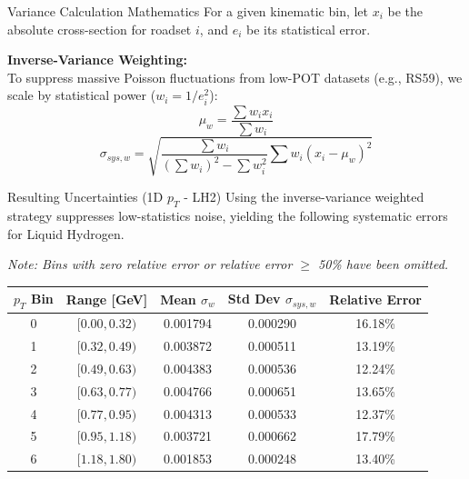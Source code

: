 \documentclass[aspectratio=169]{beamer}
\begin{document}
\begin{frame}{Variance Calculation Mathematics}
    For a given kinematic bin, let $x_i$ be the absolute cross-section for roadset $i$, and $e_i$ be its statistical error.
    \vspace{0.5cm}
    
    \textbf{Inverse-Variance Weighting:} \\
    To suppress massive Poisson fluctuations from low-POT datasets (e.g., RS59), we scale by statistical power ($w_i = 1/e_i^2$):
    \vspace{0.3cm}
    \[
    \mu_w = \frac{\sum w_i x_i}{\sum w_i}
    \]
    \vspace{0.3cm}
    \[
    \sigma_{sys, w} = \sqrt{ \frac{\sum w_i}{\left(\sum w_i\right)^2 - \sum w_i^2} \sum w_i (x_i - \mu_w)^2 }
    \]
\end{frame}

\begin{frame}{Resulting Uncertainties (1D $p_T$ - LH2)}
    Using the inverse-variance weighted strategy suppresses low-statistics noise, yielding the following systematic errors for Liquid Hydrogen.
    
    \textit{Note: Bins with zero relative error or relative error $\geq$ 50\% have been omitted.}
    \vspace{0.3cm}
    
    \begin{table}[]
        \centering
        \begin{tabular}{@{}ccccc@{}}
        \toprule
        \textbf{$p_T$ Bin} & \textbf{Range [GeV]} & \textbf{Mean $\sigma_w$} & \textbf{Std Dev $\sigma_{sys,w}$} & \textbf{Relative Error} \\ \midrule
        0 & $[0.00, 0.32)$ & 0.001794 & 0.000290 & 16.18\% \\
        1 & $[0.32, 0.49)$ & 0.003872 & 0.000511 & 13.19\% \\
        2 & $[0.49, 0.63)$ & 0.004383 & 0.000536 & 12.24\% \\
        3 & $[0.63, 0.77)$ & 0.004766 & 0.000651 & 13.65\% \\
        4 & $[0.77, 0.95)$ & 0.004313 & 0.000533 & 12.37\% \\
        5 & $[0.95, 1.18)$ & 0.003721 & 0.000662 & 17.79\% \\
        6 & $[1.18, 1.80)$ & 0.001853 & 0.000248 & 13.40\% \\
        \bottomrule
        \end{tabular}
    \end{table}
\end{frame}
\end{document}

